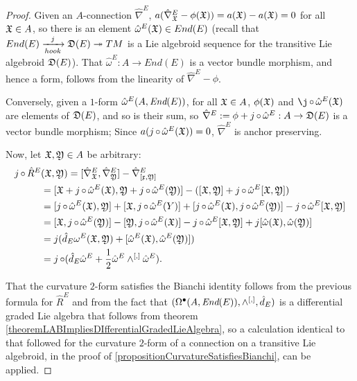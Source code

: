 \begin{proof}
Given an $A$-connection $\hat \nabla^E$, $a(\hat \nabla^E_{\oid X} - \phi(\oid X)) = a(\oid X) - a(\oid X) = 0$ for all $\mathfrak{X} \in A$, so there is an element $\hat \omega^E(\mathfrak{X}) \in End(E)$ (recall that $End(E) \xrightarrow[hook]{j} \mathfrak{D}(E) \twoheadrightarrow TM$ is a Lie algebroid sequence for the transitive Lie algebroid $\mathfrak{D}(E)$). That $\hat \omega^E: A \to End(E)$ is a vector bundle morphism, and hence a form, follows from the linearity of $\hat \nabla^E - \phi$. 

Conversely, given a $1$-form $\hat \omega^E(A, \operatorname{\textit{End}}(E))$, for all $\mathfrak{X} \in A$, $\phi(\oid X)$ and $\j \comp \hat \omega^E(\oid X)$ are elements of $\mathfrak{D}(E)$, and so is their sum, so $\hat \nabla^E := \phi + j \comp \hat \omega^E: A \to \alg D(E)$ is a vector bundle morphism; Since $a(j \operatorname{\circ} \hat \omega^E(\mathfrak{X})) = 0$, $\hat \nabla^E$ is anchor preserving.

Now, let $\mathfrak{X}, \mathfrak{Y} \in A$ be arbitrary:
\begin{align*}
    j \operatorname{\circ} \hat R^E&(\mathfrak{X}, \mathfrak{Y}) 
        = [\hat \nabla^E_{\mathfrak{X}}, \hat \nabla^E_{\mathfrak{Y}}] - \hat \nabla^E_{[\mathfrak{x}, \mathfrak{Y}]}\\
        &= [\mathfrak{X} + j \operatorname{\circ} \hat \omega^E(\mathfrak{X}), \mathfrak{Y} + j \operatorname{\circ} \hat \omega^E(\mathfrak{Y})] - ([\mathfrak{X}, \mathfrak{Y}] + j \operatorname{\circ} \hat \omega^E[\mathfrak{X}, \mathfrak{Y}])\\
        &= [j \operatorname{\circ} \hat \omega^E(\mathfrak{X}), \mathfrak{Y}] + [\mathfrak{X}, j \operatorname{\circ} \hat \omega^E(Y)] + [j \operatorname{\circ} \hat \omega^E(\mathfrak{X}), j \operatorname{\circ} \hat \omega^E(\mathfrak{Y})] - j \operatorname{\circ} \hat \omega^E[\mathfrak{X}, \mathfrak{Y}]\\
        &= [\mathfrak{X}, j \operatorname{\circ} \hat \omega^E(\mathfrak{Y})] - [\mathfrak{Y}, j \operatorname{\circ} \hat \omega^E(\mathfrak{X})] - j \operatorname{\circ} \hat \omega^E[\mathfrak{X}, \mathfrak{Y}] + j[\hat \omega(\mathfrak{X}), \hat \omega (\mathfrak{Y})]\\
        &= j(\hat d_E \omega^E(\mathfrak{X}, \mathfrak{Y}) + [\hat \omega^E(\mathfrak{X}), \hat \omega^E(\mathfrak{Y})])\\
        &= j \operatorname{\circ} (\hat d_E \hat \omega^E + \frac{1}{2} \hat \omega^E \wedge^{[,]} \hat \omega^E).
\end{align*}

That the curvature $2$-form satisfies the Bianchi identity follows from the previous formula for $\hat R^E$ and from the fact that $(\Omega^\bullet(A, \operatorname{\textit{End}}(E)), \wedge^{[,]}, \hat d_E)$ is a differential graded Lie algebra that follows from theorem \ref{theoremLABImpliesDIfferentialGradedLieAlgebra}, so a calculation identical to that followed for the curvature $2$-form of a connection on a transitive Lie algebroid, in the proof of \ref{propositionCurvatureSatisfiesBianchi}, can be applied.
\end{proof}

